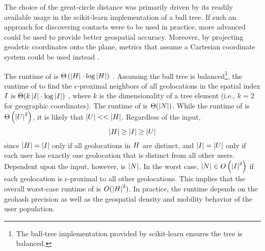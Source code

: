 The choice of the great-circle distance was primarily driven by its readily available usage in the scikit-learn \citep{sklearn2013} implementation of a ball tree. If such an approach for discovering contacts were to be used in practice, more advanced  \cite[pp. 71--130]{Lu2014} could be used to provide better geospatial accuracy. Moreover, by projecting geodetic coordinates onto the plane, metrics that assume a Cartesian coordinate system could be used instead \cite[pp. 265--326]{Lu2014}.

The runtime of  is $\Theta\left(\left\vert H \right\vert \cdot \log\left\vert H \right\vert\right)$ \citep{Omohundro1989}. Assuming the ball tree is balanced\footnote{The ball-tree implementation provided by scikit-learn \citep{sklearn2013} ensures the tree is balanced.}, the runtime of  to find the $\epsilon$-proximal neighbors of all geolocations in the spatial index $I$ is $\Theta(k \left\vert I \right\vert \cdot \log\left\vert I \right\vert)$ , where $k$ is the dimensionality of a tree element (i.e., $k = 2$ for geographic coordinates). The runtime of  is $\Theta(\left\vert N \right\vert)$. While the runtime of  is $\Theta\left(\left\vert U \right\vert^2\right)$, it is likely that $\left\vert U \right\vert << \left\vert H \right\vert$. Regardless of the input,
\begin{equation*}
  \left\vert H \right\vert \geq \left\vert I \right\vert \geq \left\vert U \right\vert
\end{equation*}
since $\left\vert H \right\vert = \left\vert I \right\vert$ only if all geolocations in $H$ are distinct, and $\left\vert I \right\vert = \left\vert U \right\vert$ only if each user has exactly one geolocation that is distinct from all other users. Dependent upon the input, however, is $\left\vert N \right\vert$. In the worst case, $\left\vert N \right\vert \in O\left(\left\vert I \right\vert^2\right)$ if each geolocation is $\epsilon$-proximal to all other geolocations. This implies that the overall worst-case runtime of  is $O(\left\vert H \right\vert^2)$. In practice, the runtime depends on the geohash precision as well as the geospatial density and mobility behavior of the user population.